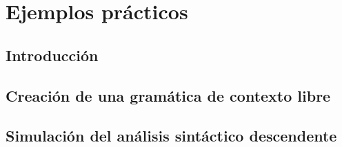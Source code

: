 \chapter{Ejemplos prácticos}


\section{Introducción}


\section{Creación de una gramática de contexto libre}


\section{Simulación del análisis sintáctico descendente}
